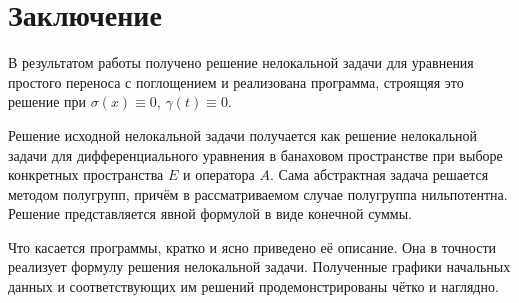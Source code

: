 \documentclass{article}
\theoremstyle{definition}
\begin{document}
%
%
%
%
%

\section*{Заключение}
В результатом работы получено решение нелокальной задачи для уравнения простого переноса с поглощением и реализована программа,
строящяя это решение при $\sigma(x) \equiv 0$, $\gamma(t) \equiv 0$. 

Решение исходной нелокальной задачи получается как решение нелокальной задачи для дифференциального уравнения в банаховом пространстве 
при выборе конкретных пространства $E$ и оператора $A$. Сама абстрактная задача решается методом полугрупп, причём в рассматриваемом 
случае полугруппа нильпотентна. Решение представляется явной формулой в виде конечной суммы. 

Что касается программы, кратко и ясно приведено её описание. Она в точности реализует формулу решения нелокальной задачи. Полученные графики начальных данных и соответствующих им решений продемонстрированы чётко и наглядно.
\end{document}
